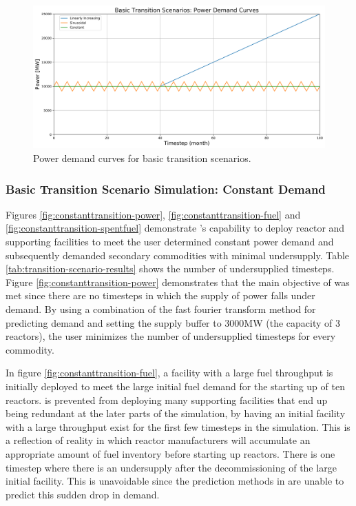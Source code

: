     \begin{figure}[]
        \begin{center}
            \includegraphics[scale=0.37]{./figures/powerplots.png}
        \end{center}
            \caption{Power demand curves for basic transition scenarios.}
        \label{fig:powerplots}
    \end{figure}

\subsubsection{Basic Transition Scenario Simulation: Constant Demand}
Figures \ref{fig:constanttransition-power}, \ref{fig:constanttransition-fuel}
and \ref{fig:constanttransition-spentfuel} demonstrate \deploy's capability 
to deploy reactor and supporting facilities to meet the user 
determined constant power demand and subsequently demanded 
secondary commodities with minimal undersupply. 
Table \ref{tab:transition-scenario-results} shows the number of 
undersupplied timesteps. 
Figure \ref{fig:constanttransition-power} demonstrates that
the main objective of \deploy was met since there are no timesteps
in which the supply of power falls under demand.
By using a combination of the fast fourier transform method for 
predicting demand and setting the supply buffer to 3000MW 
(the capacity of 3 reactors), the user minimizes the number of 
undersupplied timesteps for every commodity.

In figure \ref{fig:constanttransition-fuel},
a facility with a large fuel throughput is initially
deployed to meet the large initial fuel demand for the starting
up of ten reactors. 
\deploy is prevented from deploying many supporting
facilities that end up being redundant at the later parts of 
the simulation, by having an initial facility with a large throughput
exist for the first few timesteps in the simulation.
This is a reflection of reality in which reactor manufacturers will 
accumulate an appropriate amount of fuel inventory before starting 
up reactors. 
There is one timestep where there is an undersupply after the 
decommissioning of the large initial facility.  
This is unavoidable since the prediction methods in \deploy are 
unable to predict this sudden drop in demand. 

